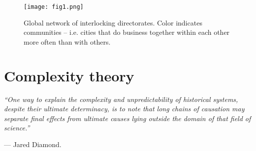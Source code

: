 \begin{figure*}
\begin{center}
\texttt{[image: fig1.png]}
\end{center}
\caption{Global network of interlocking directorates. Color indicates communities -- i.e. cities that do business together within each other more often than with others.}
\label{fig:fig1}
\end{figure*}

\section{Complexity theory}
\label{sec:complexity}
\textit{``One way to explain the complexity and unpredictability of historical systems, despite their ultimate determinacy, is to note that long chains of causation may separate final effects from ultimate causes lying outside the domain of that field of science.''}
\begin{flushright}
--- Jared Diamond.
\end{flushright}



